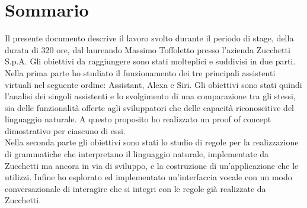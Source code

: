 
\cleardoublepage
{}
{}
\begingroup
\let\clearpage\relax
\let\cleardoublepage\relax
\let\cleardoublepage\relax

\chapter*{Sommario}

Il presente documento descrive il lavoro svolto durante il periodo di stage, della durata di 320 ore, dal laureando Massimo Toffoletto presso l'azienda Zucchetti S.p.A.
Gli obiettivi da raggiungere sono stati molteplici e suddivisi in due parti.\\
Nella prima parte ho studiato il funzionamento dei tre principali assistenti virtuali nel seguente ordine: Assistant, Alexa e Siri. Gli obiettivi sono stati quindi l'analisi dei singoli assistenti e lo svolgimento di una comparazione tra gli stessi, sia delle funzionalità offerte agli sviluppatori che delle capacità riconoscitive del linguaggio naturale. A questo proposito ho realizzato un proof of concept dimostrativo per ciascuno di essi. \\
Nella seconda parte gli obiettivi sono stati lo studio di regole per la realizzazione di grammatiche che interpretano il linguaggio naturale, implementate da Zucchetti ma ancora in via di sviluppo, e la costruzione di un'applicazione che le utilizzi. Infine ho esplorato ed implementato un'interfaccia vocale con un modo conversazionale di interagire che si integri con le regole già realizzate da Zucchetti.

%
%

\endgroup			

\vfill

